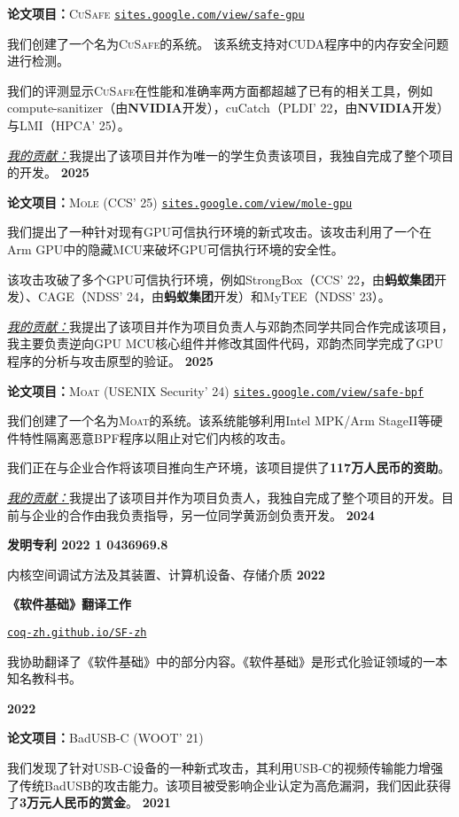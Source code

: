\documentclass{resume}
\begin{document}
\begin{content}
	\textbf{论文项目：}\textsc{CuSafe} \enspace
	{\href{https://sites.google.com/view/safe-gpu/}{\texttt{sites.google.com/view/safe-gpu}}}

	{我们创建了一个名为\textsc{CuSafe}的系统。 该系统支持对CUDA程序中的内存安全问题进行检测。}

	{我们的评测显示\textsc{CuSafe}在性能和准确率两方面都超越了已有的相关工具，例如compute-sanitizer（由\textbf{NVIDIA}开发），cuCatch（PLDI’ 22，由\textbf{NVIDIA}开发）与LMI（HPCA’ 25）。}

  {\underline{\textit{我的贡献：}}我提出了该项目并作为唯一的学生负责该项目，我独自完成了整个项目的开发。}
	\hfill {\bf 2025}


	\textbf{论文项目：}\textsc{Mole} (CCS' 25) \enspace
	{\href{https://sites.google.com/view/mole-gpu}{\texttt{sites.google.com/view/mole-gpu}}}

	{我们提出了一种针对现有GPU可信执行环境的新式攻击。该攻击利用了一个在Arm GPU中的隐藏MCU来破坏GPU可信执行环境的安全性。}

	{该攻击攻破了多个GPU可信执行环境，例如StrongBox（CCS’ 22，由\textbf{蚂蚁集团}开发）、CAGE（NDSS’ 24，由\textbf{蚂蚁集团}开发）和MyTEE（NDSS’ 23）。}

  {\underline{\textit{我的贡献：}}我提出了该项目并作为项目负责人与邓韵杰同学共同合作完成该项目，我主要负责逆向GPU MCU核心组件并修改其固件代码，邓韵杰同学完成了GPU程序的分析与攻击原型的验证。}
	\hfill{\bf 2025}


	\textbf{论文项目：}\textsc{Moat} (USENIX Security' 24) \enspace
	{\href{https://sites.google.com/view/safe-bpf/}{\texttt{sites.google.com/view/safe-bpf}}}

	{我们创建了一个名为\textsc{Moat}的系统。该系统能够利用Intel MPK/Arm StageII等硬件特性隔离恶意BPF程序以阻止对它们内核的攻击。}

	{我们正在与企业合作将该项目推向生产环境，该项目提供了\textbf{117万人民币的资助}。}

  {\underline{\textit{我的贡献：}}我提出了该项目并作为项目负责人，我独自完成了整个项目的开发。目前与企业的合作由我负责指导，另一位同学黄沥剑负责开发。}
	\hfill {\bf 2024}

	\textbf{发明专利 2022 1 0436969.8}

	{内核空间调试方法及其装置、计算机设备、存储介质}
	\hfill {\bf 2022}

	\textbf{《软件基础》翻译工作} \enspace
	{\href{https://coq-zh.github.io/SF-zh/}{\texttt{coq-zh.github.io/SF-zh}}

		{我协助翻译了《软件基础》中的部分内容。《软件基础》是形式化验证领域的一本知名教科书。}}
	\hfill {\bf 2022}

	\textbf{论文项目：}BadUSB-C (WOOT' 21)

	{我们发现了针对USB-C设备的一种新式攻击，其利用USB-C的视频传输能力增强了传统BadUSB的攻击能力。该项目被受影响企业认定为高危漏洞，我们因此获得了\textbf{3万元人民币的赏金}。}
	\hfill {\bf 2021}


	\sectionlineskip
\end{content}
\end{document}

